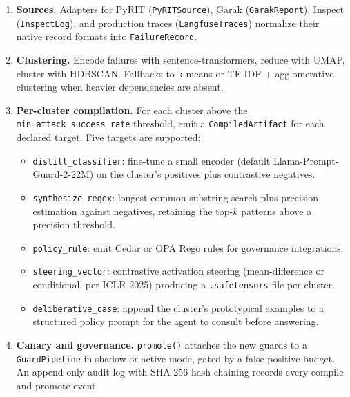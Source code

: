 \begin{enumerate}[leftmargin=2em, itemsep=0.25em]
  \item \textbf{Sources.} Adapters for PyRIT (\texttt{PyRITSource}),
    Garak (\texttt{GarakReport}), Inspect (\texttt{InspectLog}),
    and production traces (\texttt{LangfuseTraces}) normalize their
    native record formats into \texttt{FailureRecord}.

  \item \textbf{Clustering.} Encode failures with
    sentence-transformers, reduce with UMAP, cluster with HDBSCAN.
    Fallbacks to k-means or TF-IDF + agglomerative clustering when
    heavier dependencies are absent.

  \item \textbf{Per-cluster compilation.} For each cluster above
    the \texttt{min\_attack\_success\_rate} threshold, emit a
    \texttt{CompiledArtifact} for each declared target. Five
    targets are supported:
    \begin{itemize}[leftmargin=1.5em]
      \item \texttt{distill\_classifier}: fine-tune a small encoder
        (default Llama-Prompt-Guard-2-22M) on the cluster's
        positives plus contrastive negatives.
      \item \texttt{synthesize\_regex}: longest-common-substring
        search plus precision estimation against negatives,
        retaining the top-$k$ patterns above a precision threshold.
      \item \texttt{policy\_rule}: emit Cedar or OPA Rego rules for
        governance integrations.
      \item \texttt{steering\_vector}: contrastive activation
        steering (mean-difference or conditional, per ICLR 2025)
        producing a \texttt{.safetensors} file per cluster.
      \item \texttt{deliberative\_case}: append the cluster's
        prototypical examples to a structured policy prompt for the
        agent to consult before answering.
    \end{itemize}

  \item \textbf{Canary and governance.} \texttt{promote()} attaches
    the new guards to a \texttt{GuardPipeline} in shadow or active
    mode, gated by a false-positive budget. An append-only audit
    log with SHA-256 hash chaining records every compile and
    promote event.
\end{enumerate}
